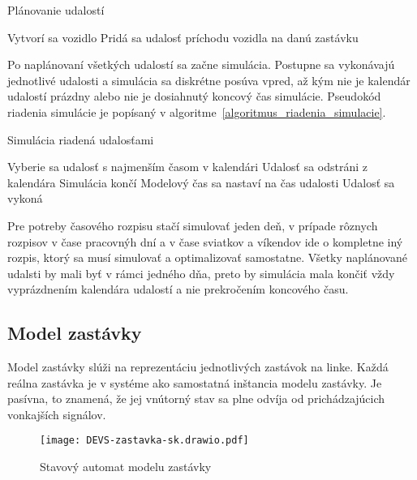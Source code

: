 \vspace*{\dimexpr0.5\baselineskip\relax}
\begin{algorithm}[H]\label{algoritmus_planovanie_udalosti}
  \caption{Plánovanie udalostí}
     {
      Vytvorí sa vozidlo\;
       {
        Pridá sa udalosť príchodu vozidla na danú zastávku\;
      }
    }
\end{algorithm}
\vspace*{\dimexpr0.5\baselineskip\relax}

Po naplánovaní všetkých udalostí sa začne simulácia.
Postupne sa vykonávajú jednotlivé udalosti a simulácia sa diskrétne posúva vpred, až kým nie je kalendár udalostí prázdny alebo nie je dosiahnutý koncový čas simulácie.
Pseudokód riadenia simulácie je popísaný v algoritme~\ref{algoritmus_riadenia_simulacie}.

\vspace*{\dimexpr0.5\baselineskip\relax}
\begin{algorithm}[H]\label{algoritmus_riadenia_simulacie}
\caption{Simulácia riadená udalosťami}
   {
    Vyberie sa udalosť s najmenším časom v kalendári\;
    Udalosť sa odstráni z kalendára\;
     {
      Simulácia končí\;
    }
    Modelový čas sa nastaví na čas udalosti\;
    Udalosť sa vykoná\;
  }
\end{algorithm}
\vspace*{\dimexpr0.5\baselineskip\relax}

Pre potreby časového rozpisu stačí simulovať jeden deň, v prípade rôznych rozpisov v čase pracovnýh dní a v čase sviatkov a víkendov ide o kompletne iný rozpis, ktorý sa musí simulovať a optimalizovať samostatne.
Všetky naplánované udalsti by mali byť v rámci jedného dňa, preto by simulácia mala končiť vždy vyprázdnením kalendára udalostí a nie prekročením koncového času.

\subsection*{Model zastávky}\label{model_zastavky}

Model zastávky slúži na reprezentáciu jednotlivých zastávok na linke.
Každá reálna zastávka je v systéme ako samostatná inštancia modelu zastávky.
Je pasívna, to znamená, že jej vnútorný stav sa plne odvíja od prichádzajúcich vonkajších signálov.

\begin{figure}[h]\label{fig:model_zastavky}
  \centering
  \texttt{[image: DEVS-zastavka-sk.drawio.pdf]}
  \caption{Stavový automat modelu zastávky}
\end{figure}


